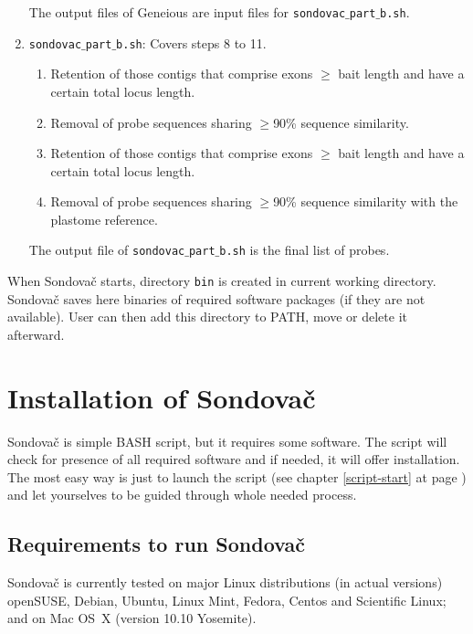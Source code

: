 \documentclass[a4paper, 11pt, twoside]{article}
\begin{document}
\begin{enumerate}[label=\textbf{\Alph*.}]
  The output files of Geneious are input files for \texttt{sondovac$\_$part$\_$b.sh}.

  \item \texttt{sondovac$\_$part$\_$b.sh}: Covers steps 8 to 11.
    \begin{enumerate}[label=\textbf{\arabic*.}, resume]
      \item Retention of those contigs that comprise exons $\geq$ bait length and have a certain total locus length.
      \item Removal of probe sequences sharing $\geq$90\% sequence similarity.
      \item Retention of those contigs that comprise exons $\geq$ bait length and have a certain total locus length.
      \item Removal of probe sequences sharing $\geq$90\% sequence similarity with the plastome reference.
    \end{enumerate}

  The output file of \texttt{sondovac$\_$part$\_$b.sh} is the final list of probes.

\end{enumerate}

When Sondovač starts, directory \texttt{bin} is created in current working directory. Sondovač saves here binaries of required software packages (if they are not available). User can then add this directory to PATH, move or delete it afterward.

\section{Installation of Sondovač}
\label{install}

Sondovač is simple BASH script, but it requires some software. The script will check for presence of all required software and if needed, it will offer installation. The most easy way is just to launch the script (see chapter \ref{script-start} at page \pageref{script-start}) and let yourselves to be guided through whole needed process.

\subsection{Requirements to run Sondovač}

Sondovač is currently tested on major Linux distributions (in actual versions) openSUSE, Debian, Ubuntu, Linux Mint, Fedora, Centos and Scientific Linux; and on Mac OS~X (version 10.10 Yosemite).
\end{document}
